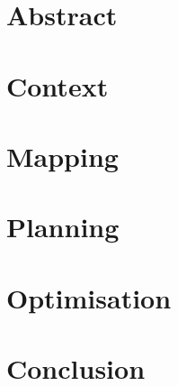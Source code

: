 \documentclass{report}
\begin{document}


\chapter*{Abstract}


\tableofcontents

\chapter{Context}


\chapter{Mapping}


\chapter{Planning}


\chapter{Optimisation}


\chapter*{Conclusion}


\listofalgorithms
{}
\end{document}

